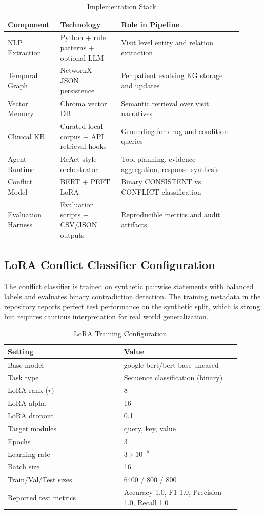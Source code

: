 \documentclass[conference]{IEEEtran}
\begin{document}
\begin{table}[t]
\caption{Implementation Stack}
\label{tab:stack}
\centering
\begin{tabular}{p{0.19\linewidth}p{0.24\linewidth}p{0.48\linewidth}}
\toprule
Component & Technology & Role in Pipeline \\
\midrule
NLP Extraction & Python + rule patterns + optional LLM & Visit level entity and relation extraction \\
Temporal Graph & NetworkX + JSON persistence & Per patient evolving KG storage and updates \\
Vector Memory & Chroma vector DB & Semantic retrieval over visit narratives \\
Clinical KB & Curated local corpus + API retrieval hooks & Grounding for drug and condition queries \\
Agent Runtime & ReAct style orchestrator & Tool planning, evidence aggregation, response synthesis \\
Conflict Model & BERT + PEFT LoRA & Binary CONSISTENT vs CONFLICT classification \\
Evaluation Harness & Evaluation scripts + CSV/JSON outputs & Reproducible metrics and audit artifacts \\
\bottomrule
\end{tabular}
\end{table}

\subsection{LoRA Conflict Classifier Configuration}
The conflict classifier is trained on synthetic pairwise statements with balanced labels and evaluates binary contradiction detection. The training metadata in the repository reports perfect test performance on the synthetic split, which is strong but requires cautious interpretation for real world generalization.

\begin{table}[t]
\caption{LoRA Training Configuration}
\label{tab:lora}
\centering
\begin{tabular}{p{0.45\linewidth}p{0.45\linewidth}}
\toprule
Setting & Value \\
\midrule
Base model & google-bert/bert-base-uncased \\
Task type & Sequence classification (binary) \\
LoRA rank ($r$) & 8 \\
LoRA alpha & 16 \\
LoRA dropout & 0.1 \\
Target modules & query, key, value \\
Epochs & 3 \\
Learning rate & $3 \times 10^{-5}$ \\
Batch size & 16 \\
Train/Val/Test sizes & 6400 / 800 / 800 \\
Reported test metrics & Accuracy 1.0, F1 1.0, Precision 1.0, Recall 1.0 \\
\bottomrule
\end{tabular}
\end{table}
\end{document}
